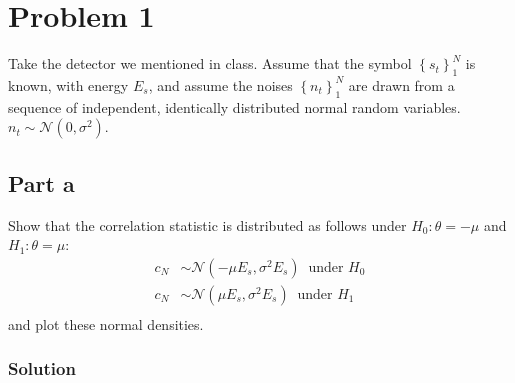 \documentclass[a4paper]{article}
\begin{document}
\section*{Problem 1}%
Take the detector we mentioned in class. Assume that the symbol $\left\{ s_t \right\}_1^N$ is known, with energy $E_s$, and assume the noises $\left\{ n_t \right\}_1^N$ are drawn from a sequence of independent, identically distributed normal random variables. $n_t \sim \mathcal{N}(0, \sigma^2)$.

\subsection*{Part a}%
\label{sub:Part a}
Show that the correlation statistic is distributed as follows under $H_0: \theta = -\mu$ and $H_1: \theta = \mu$:
\[
  \begin{aligned}
    c_N &\sim \mathcal{N}(-\mu E_s, \sigma^2 E_s) \ \text{ under } H_0 \\ 
    c_N &\sim \mathcal{N}(\mu E_s, \sigma^2 E_s) \ \text{ under } H_1 \\ 
  \end{aligned}
\]
and plot these normal densities.

\subsubsection*{Solution}%
\label{ssub:Solution}
\end{document}
